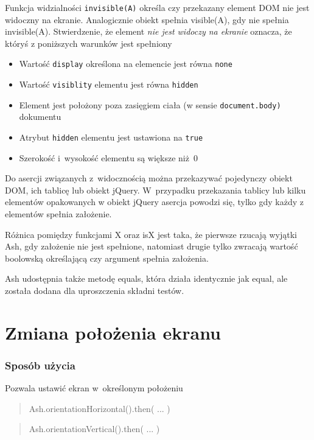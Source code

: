\documentclass[brudnopis]{xmgr}
\begin{document}
Funkcja widzialności \texttt{invisible(A)} określa czy przekazany element DOM nie jest widoczny na ekranie. Analogicznie obiekt spełnia visible(A), gdy nie spełnia invisible(A). Stwierdzenie, że element {\it nie jest widoczy na ekranie} oznacza, że któryś z poniższych warunków jest spełniony

\begin{itemize}
  \item Wartość \texttt{display} określona na elemencie jest równa \texttt{none}
  \item Wartość \texttt{visiblity} elementu jest równa \texttt{hidden}
  \item Element jest położony poza zasięgiem ciała (w sensie \texttt{document.body)} dokumentu
  \item Atrybut \texttt{hidden} elementu jest ustawiona na \texttt{true}
  \item Szerokość i~wysokość elementu są większe niż~0
\end{itemize}

Do asercji związanych z~widocznością można przekazywać pojedynczy obiekt DOM, ich tablicę lub obiekt jQuery. W~przypadku przekazania tablicy lub kilku elementów opakowanych w obiekt jQuery asercja powodzi się, tylko gdy każdy z elementów spełnia założenie. 

Różnica pomiędzy funkcjami X oraz isX jest taka, że pierwsze rzucają wyjątki Ash, gdy założenie nie jest spełnione, natomiast drugie tylko zwracają wartość boolowską określającą czy argument spełnia założenia.  

Ash udostępnia także metodę equals, która działa identycznie jak equal, ale została dodana dla uproszczenia składni testów.

\section{Zmiana położenia ekranu}

\subsubsection{Sposób użycia}
Pozwala ustawić ekran w~określonym położeniu

\begin{quote}
Ash.orientationHorizontal().then( ... ) 
\end{quote}

\begin{quote}
Ash.orientationVertical().then( ... ) 
\end{quote}
\end{document}
